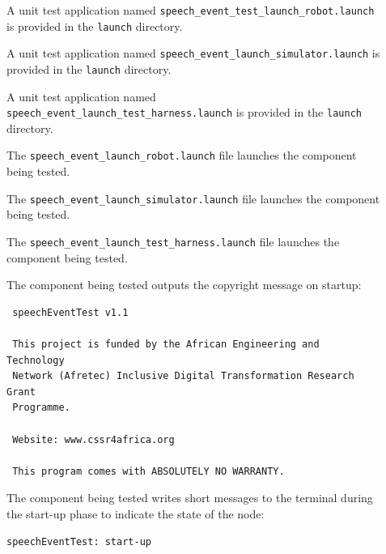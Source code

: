 \documentclass{CSSRforAfrica}
\newcommand{\checkboxChecked}{\fbox{\ding{51}}} %
\newcommand{\checkboxDashed}{\fbox{--}}         %
\begin{document}
\begin{description}

\item[\checkboxChecked] A unit test application named {\small \verb+speech_event_test_launch_robot.launch+} is provided in the {\small \verb+launch+} directory.

\item[\checkboxDashed] A unit test application named {\small \verb+speech_event_launch_simulator.launch+} is provided in the {\small \verb+launch+} directory.

\item[\checkboxChecked] A unit test application named {\small \verb+speech_event_launch_test_harness.launch+} is provided in the {\small \verb+launch+} directory.

\item[\checkboxChecked] The {\small \verb+speech_event_launch_robot.launch+} file launches the component being tested.

\item[\checkboxDashed] The {\small \verb+speech_event_launch_simulator.launch+} file launches the component being tested.

\item[\checkboxChecked] The {\small \verb+speech_event_launch_test_harness.launch+} file launches the component being tested.

\item[\checkboxChecked] The component being tested outputs the copyright message on startup:
{\small 
\begin{verbatim}
 speechEventTest v1.1
 
 This project is funded by the African Engineering and Technology
 Network (Afretec) Inclusive Digital Transformation Research Grant
 Programme.
 
 Website: www.cssr4africa.org
 
 This program comes with ABSOLUTELY NO WARRANTY.
\end{verbatim}}

\item[\checkboxChecked]  The component being tested writes short messages to the terminal during the start-up phase to indicate the state of the node:
{\small 
\begin{verbatim}
speechEventTest: start-up
\end{verbatim}}


\end{description}
\end{document}
